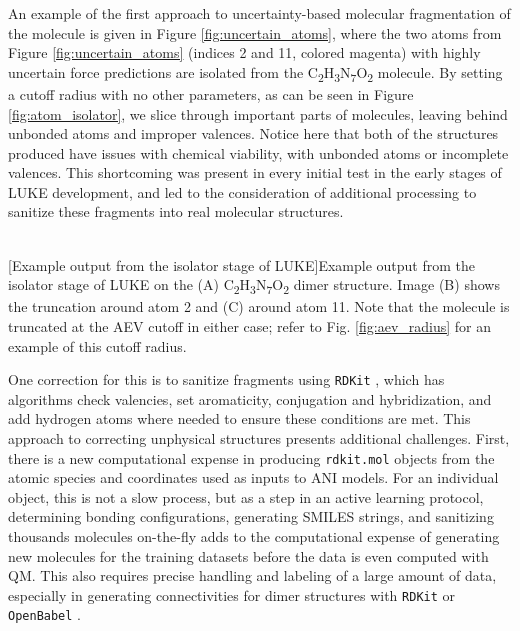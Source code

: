 An example of the first approach to uncertainty-based molecular fragmentation of the molecule is given in Figure \ref{fig:uncertain_atoms}, where the two atoms from Figure \ref{fig:uncertain_atoms} (indices 2 and 11, colored magenta) with highly uncertain force predictions are isolated from the C\textsubscript{2}H\textsubscript{3}N\textsubscript{7}O\textsubscript{2} molecule.
By setting a cutoff radius with no other parameters, as can be seen in Figure \ref{fig:atom_isolator}, we slice through important parts of molecules, leaving behind unbonded atoms and improper valences.
Notice here that both of the structures produced have issues with chemical viability, with unbonded atoms or incomplete valences.
This shortcoming was present in every initial test in the early stages of LUKE development, and led to the consideration of additional processing to sanitize these fragments into real molecular structures. 

\begin{flushleft}
\begin{multiFigure}
\begin{centering}
     \\
[Example output from the isolator stage of LUKE]{Example output from the isolator stage of LUKE on the (A)
C\textsubscript{2}H\textsubscript{3}N\textsubscript{7}O\textsubscript{2} dimer structure. Image (B) shows the truncation around atom 2 and (C) around atom 11. Note that the molecule is truncated at the AEV cutoff in either case; refer to Fig. \ref{fig:aev_radius} for an example of this cutoff radius.
}
\label{fig:atom_isolator}
\end{centering}
\end{multiFigure}
\end{flushleft}


One correction for this is to sanitize fragments using \verb|RDKit| \cite{rdkit}, which has algorithms check valencies, set aromaticity, conjugation and hybridization, and add hydrogen atoms where needed to ensure these conditions are met.
This approach to correcting unphysical structures presents additional challenges. 
First, there is a new computational expense in producing \verb|rdkit.mol| objects from the atomic species and coordinates used as inputs to ANI models.
For an individual object, this is not a slow process, but as a step in an active learning protocol, determining bonding configurations, generating SMILES strings, and sanitizing thousands molecules on-the-fly adds to the computational expense of generating new molecules for the training datasets before the data is even computed with QM.
This also requires precise handling and labeling of a large amount of data, especially in generating connectivities for dimer structures with \verb|RDKit| or \verb|OpenBabel| \cite{babel}.

